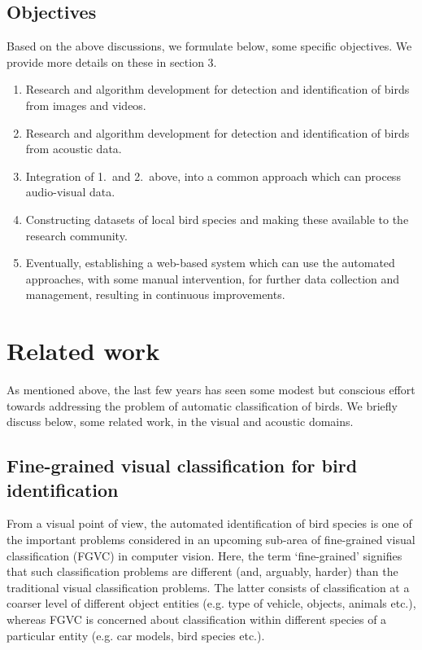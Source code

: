 \documentclass{article}
\begin{document}
\subsection{Objectives}
Based on the above discussions, we formulate below, some specific objectives. We provide more details on these in section 3.  
\begin{enumerate}
\item Research and algorithm development for detection and identification of
birds from images and videos.
\item Research and algorithm development for detection and identification of
birds from acoustic data.
\item Integration of 1.~and 2.~above, into a common approach which can process audio-visual data. 
\item Constructing datasets of local bird species and making these available to the research community.
\item Eventually, establishing a web-based system which can use the automated
approaches, with some manual intervention, for further data collection and management, resulting in continuous improvements.
\end{enumerate}

\section{Related work}
As mentioned above, the last few years has seen some modest but conscious effort towards addressing the problem of automatic classification of birds. We briefly discuss below, some related work, in the visual and acoustic domains.

\subsection{Fine-grained visual classification for bird identification}
From a visual point of view, the automated identification of bird species is one of the important problems considered in an upcoming sub-area of fine-grained visual classification (FGVC) in computer vision. Here, the term `fine-grained' signifies that such classification problems are different (and, arguably, harder) than the traditional visual classification problems. The latter consists of classification at a coarser level of different object entities (e.g. type of vehicle, objects, animals etc.), whereas FGVC is concerned about classification within different species of a particular entity (e.g. car models, bird species etc.).
\end{document}
